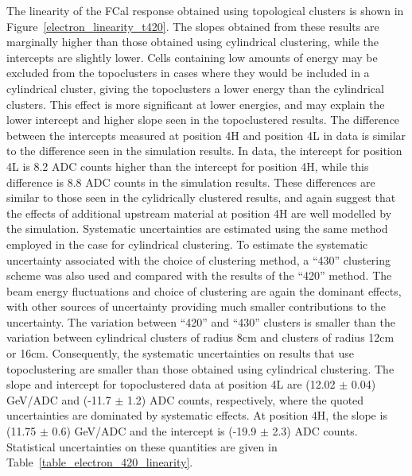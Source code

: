 
The linearity of the FCal response obtained using topological clusters is shown in Figure~\ref{electron_linearity_t420}. The slopes obtained from these results are marginally higher than those obtained using cylindrical clustering, while the intercepts are slightly lower. Cells containing low amounts of energy may be excluded from the topoclusters in cases where they would be included in a cylindrical cluster, giving the topoclusters a lower energy than the cylindrical clusters. This effect is more significant at lower energies, and may explain the lower intercept and higher slope seen in the topoclustered results. The difference between the intercepts measured at position 4H and position 4L in data is similar to the difference seen in the simulation results. In data, the intercept for position 4L is 8.2 ADC counts higher than the intercept for position 4H, while this difference is 8.8 ADC counts in the simulation results. These differences are similar to those seen in the cylidrically clustered results, and again suggest that the effects of additional upstream material at position 4H are well modelled by the simulation.
Systematic uncertainties are estimated using the same method employed in the case for cylindrical clustering. To estimate the systematic uncertainty associated with the choice of clustering method, a ``430'' clustering scheme was also used and compared with the results of the ``420'' method. The beam energy fluctuations and choice of clustering are again the dominant effects, with other sources of uncertainty providing much smaller contributions to the uncertainty. The variation between ``420'' and ``430'' clusters is smaller than the variation between cylindrical clusters of radius 8cm and clusters of radius 12cm or 16cm. Consequently, the systematic uncertainties on results that use topoclustering are smaller than those obtained using cylindrical clustering. The slope and intercept for topoclustered data at position 4L are (12.02 $\pm$ 0.04) GeV/ADC and (-11.7 $\pm$ 1.2) ADC counts, respectively, where the quoted uncertainties are dominated by systematic effects. At position 4H, the slope is (11.75 $\pm$ 0.6) GeV/ADC and the intercept is (-19.9 $\pm$ 2.3) ADC counts. Statistical uncertainties on these quantities are given in Table~\ref{table_electron_420_linearity}.

